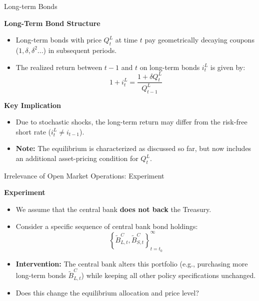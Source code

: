 \documentclass[11pt,aspectratio=169]{beamer}
\begin{document}
\begin{frame}{Long-term Bonds}
\small

\textbf{Long-Term Bond Structure}
\begin{itemize}
    \item Long-term bonds with price $Q_t^L$ at time $t$ pay geometrically decaying coupons ($1, \delta, \delta^2...$) in subsequent periods.
    \item The realized return between $t-1$ and $t$ on long-term bonds $i_t^L$ is given by:
    \begin{equation*}
        1+i_{t}^{L} = \frac{1+\delta Q_{t}^{L}}{Q_{t-1}^{L}}
    \end{equation*}
\end{itemize}

\vspace{0.2cm}

\textbf{Key Implication}
\begin{itemize}
    \item Due to stochastic shocks, the long-term return may differ from the risk-free short rate ($i_{t}^{L} \neq i_{t-1}$).
    \item \textbf{Note:} The equilibrium is characterized as discussed so far, but now includes an additional asset-pricing condition for $Q_t^L$.
\end{itemize}
\end{frame}
\begin{frame}{Irrelevance of Open Market Operations: Experiment}
\small

\textbf{Experiment}
\vspace{0.1cm}
\begin{itemize}
    \item We assume that the central bank  \textbf{does not back} the Treasury.
    \item Consider a specific sequence of central bank  bond holdings:
    \begin{equation*}
        \left\{ \tilde{B}_{L,t}^{C}, \tilde{B}_{S,t}^{C} \right\}_{t=t_{0}}^{\infty}
    \end{equation*}
    \item \textbf{Intervention:} The central bank  alters this portfolio (e.g., purchasing more long-term bonds $\tilde{B}_{L,t}^{C}$) while keeping all other policy specifications unchanged.
    \item Does this change the equilibrium allocation and price level?
\end{itemize}
\end{frame}
\end{document}
